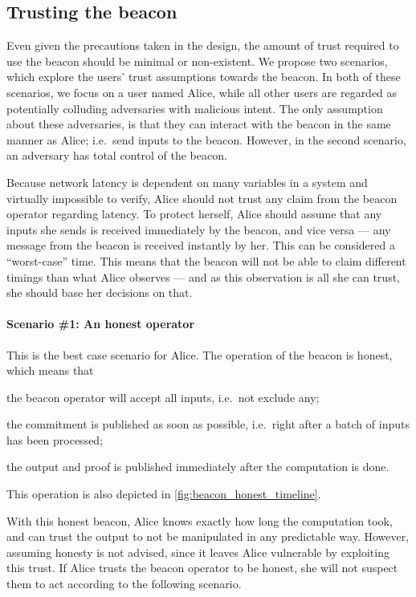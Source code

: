 \subsection{Trusting the beacon}%
\label{sub:trusting_the_beacon}

Even given the precautions taken in the design, the amount of trust required to use the beacon should be minimal or non-existent.
We propose two scenarios, which explore the users' trust assumptions towards the beacon.
In both of these scenarios, we focus on a user named Alice, while all other users are regarded as potentially colluding adversaries with malicious intent.
The only assumption about these adversaries, is that they can interact with the beacon in the same manner as Alice; i.e.\ send inputs to the beacon.
However, in the second scenario, an adversary has total control of the beacon.

Because network latency is dependent on many variables in a system and virtually impossible to verify, Alice should not trust any claim from the beacon operator regarding latency.
To protect herself, Alice should assume that any inputs she sends is received immediately by the beacon, and vice versa --- any message from the beacon is received instantly by her. This can be considered a \enquote{worst-case} time.
This means that the beacon will not be able to claim different timings than what Alice observes --- and as this observation is all she can trust, she should base her decisions on that.

\paragraph{Scenario \#1: An honest operator}
This is the best case scenario for Alice.
The operation of the beacon is honest, which means that
\begin{eletterate*}
\item the beacon operator will accept all inputs, i.e.\ not exclude any;
\item the commitment is published as soon as possible, i.e.\ right after a batch of inputs has been processed;
\item the output and proof is published immediately after the computation is done.
\end{eletterate*}
This operation is also depicted in \cref{fig:beacon_honest_timeline}.

With this honest beacon, Alice knows exactly how long the computation took, and can trust the output to not be manipulated in any predictable way.
However, assuming honesty is not advised, since it leaves Alice vulnerable by exploiting this trust.
If Alice trusts the beacon operator to be honest, she will not suspect them to act according to the following scenario.

